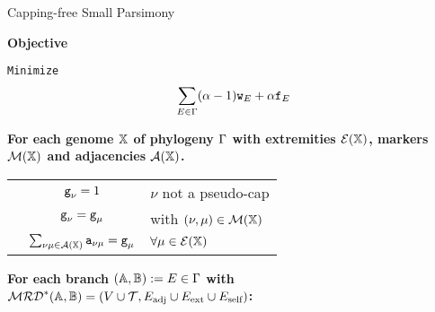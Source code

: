 
\begin{algorithm}[tbh]
\caption{Capping-free Small Parsimony}
\textbf{Objective}

\newcommand{\idx}{\texttt{ix}}
\hspace{0.5cm}\texttt{Minimize} 
\begin{equation*}
    \sum_{E \in\Gamma} (\alpha-1) {\texttt{w}}_E + \alpha {\texttt{f}}_E 
\end{equation*}


\textbf{For each genome $\mathbb{X}$ of phylogeny $\Gamma$ with extremities $\mathcal{E}(\mathbb{X})$, markers $\mathcal{M}(\mathbb{X})$ and adjacencies $\mathcal{A}(\mathbb{X})$.}

\begin{constraints}
\begin{tabular}{lcl}
    \cns \label{c:cn} & ${\texttt{g}}_\nu = 1$& $\nu$ not a pseudo-cap\\
    \cns \label{c:cn_consistent}& ${\texttt{g}}_\nu = {\texttt{g}}_\mu$ & with $(\nu,\mu) \in \mathcal{M}(\mathbb{X})$\\%
    \cns \label{c:genome}& $\sum_{\nu\mu \in \mathcal{A} (\mathbb{X})} {\texttt{a}}_{\nu\mu} = {\texttt{g}}_\mu$ & $\forall \mu \in \mathcal{E} (\mathbb{X})$\\
\end{tabular}
\end{constraints}

\medskip
{}

\textbf{For each branch $(\mathbb{A},\mathbb{B}):=E\in \Gamma$ with $\mathcal{MRD}^*(\mathbb{A},\mathbb{B}) = (V\cup\mathcal{T}, {E}_\text{adj} \cup {E}_{\text{ext}} \cup {E}_\text{self})$:}

\begin{constraints}
\begin{tabular}{lcl}


\end{tabular}
\end{constraints}
\end{algorithm}
